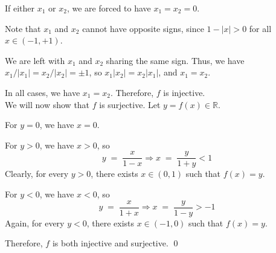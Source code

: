 \documentclass[10pt]{article}
\begin{document}
\begin{enumerate}
                If either $x_1$ or $x_2$, we are forced to have $x_1 = x_2 = 0$.
                
                Note that $x_1$ and $x_2$ cannot have opposite signs, since $1 - |x| > 0$ for all $x \in (-1,+1)$.

                We are left with $x_1$ and $x_2$ sharing the same sign. Thus, we have $x_1 / |x_1| = x_2 / |x_2| = \pm 1$, so $x_1|x_2| = x_2|x_1|$,
                and $x_1 = x_2$.

                In all cases, we have $x_1 = x_2$. Therefore, $f$ is injective. \\
                
                We will now show that $f$ is surjective. Let $y = f(x) \in \mathbb{R}$.
                
                For $y = 0$, we have $x = 0$.
                
                For $y > 0$, we have $x > 0$, so
                \[
                y \;=\; \frac{x}{1-x} \Rightarrow x \;=\; \frac{y}{1+y} < 1 \tag{$1 + y > y > 0$}
                \]
                Clearly, for every $y > 0$, there exists $x \in (0, 1)$ such that $f(x) = y$.

                For $y < 0$, we have $x < 0$, so
                \[
                y \;=\; \frac{x}{1+x} \Rightarrow x \;=\; \frac{y}{1-y} > -1 \tag{$0 > y > y - 1$}
                \]
                Again, for every $y < 0$, there exists $x \in (-1, 0)$ such that $f(x) = y$.

                Therefore, $f$ is both injective and surjective. \qed

        \end{enumerate} 
\end{document}
